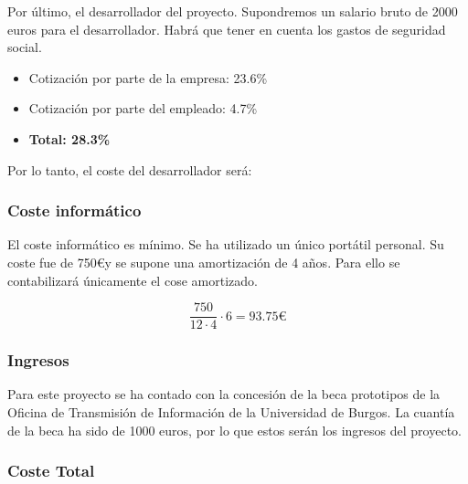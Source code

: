 Por último, el desarrollador del proyecto. Supondremos un salario bruto de 2000 euros para el desarrollador. Habrá que tener en cuenta los gastos de seguridad social.

\begin{itemize}
    \item Cotización por parte de la empresa: 23.6\%
    \item Cotización por parte del empleado: 4.7\%
    \item \textbf{Total: 28.3\%}
\end{itemize}

Por lo tanto, el coste del desarrollador será:

  
\subsubsection{Coste informático}

El coste informático es mínimo. Se ha utilizado un único portátil personal. Su coste fue de 750\euro y se supone una amortización de 4 años. Para ello se contabilizará únicamente el cose amortizado. 

 \[\frac{750}{12 \cdot 4} \cdot 6 = 93.75 \euro\]

\subsubsection{Ingresos}

Para este proyecto se ha contado con la concesión de la beca prototipos de la Oficina de Transmisión de Información de la Universidad de Burgos. La cuantía de la beca ha sido de 1000 euros, por lo que estos serán los ingresos del proyecto.

\subsubsection{Coste Total}

